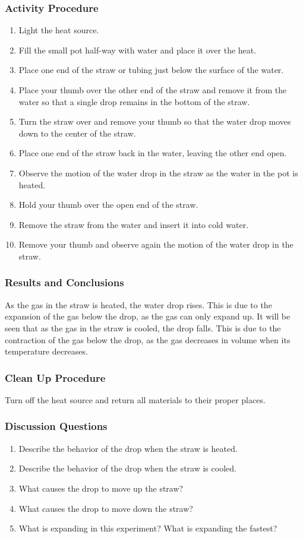 \subsubsection*{Activity Procedure}
\begin{enumerate}
\item{Light the heat source.} 
\item{Fill the small pot half-way with water and place it over the heat.} 
\item{Place one end of the straw or tubing just below the surface of the water.} 
\item{Place your thumb over the other end of the straw and remove it from the water so that a single drop remains in the bottom of the straw.} 
\item{Turn the straw over and remove your thumb so that the water drop moves down to the center of the straw.} 
\item{Place one end of the straw back in the water, leaving the other end open.} 
\item{Observe the motion of the water drop in the straw as the water in the pot is heated.} 
\item{Hold your thumb over the open end of the straw.} 
\item{Remove the straw from the water and insert it into cold water.} 
\item{Remove your thumb and observe again the motion of the water drop in the straw.} 
\end{enumerate}

\subsubsection*{Results and Conclusions}
As the gas in the straw is heated, the water drop rises. This is due to the expansion of the gas below the drop, as the gas can only expand up. It will be seen that as the gas in the straw is cooled, the drop falls. This is due to the contraction of the gas below the drop, as the gas decreases in volume when its temperature decreases.  

\subsubsection*{Clean Up Procedure}
Turn off the heat source and return all materials to their proper places.

\subsubsection*{Discussion Questions}
\begin{enumerate}
\item{Describe the behavior of the drop when the straw is heated.} 
\item{Describe the behavior of the drop when the straw is cooled.} 
\item{What causes the drop to move up the straw?}
\item{What causes the drop to move down the straw?}
\item{What is expanding in this experiment? What is expanding the fastest?}
\end{enumerate}

